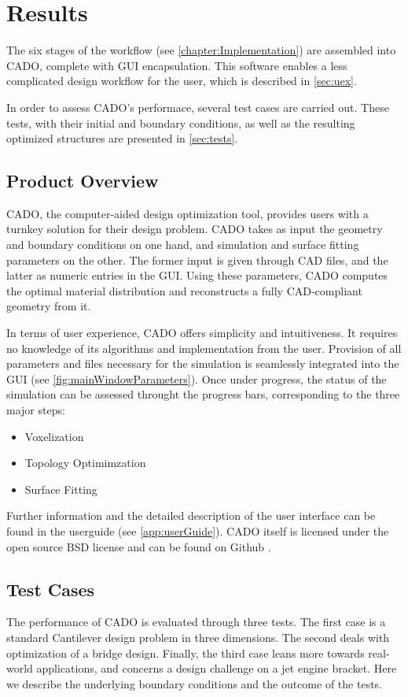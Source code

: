 \chapter{Results}
The six stages of the workflow (see \autoref{chapter:Implementation}) are assembled into CADO, complete with GUI encapsulation. This software enables a less complicated design workflow for the user, which is described in \autoref{sec:uex}. 

In order to assess CADO's performace, several test cases are carried out. These tests, with their initial and boundary conditions, as well as the resulting optimized structures are presented in \autoref{sec:tests}.

\section{Product Overview}
\label{sec:uex}
CADO, the computer-aided design optimization tool, provides users with a turnkey solution for their design problem. CADO takes as input the geometry and boundary conditions on one hand, and simulation and surface fitting parameters on the other. The former input is given through CAD files, and the latter as numeric entries in the GUI. Using these parameters, CADO computes the optimal material distribution and reconstructs a fully CAD-compliant geometry from it.

In terms of user experience, CADO offers simplicity and intuitiveness. It requires no knowledge of its algorithms and implementation from the user. Provision of all parameters and files necessary for the simulation is seamlessly integrated into the GUI (see \autoref{fig:mainWindowParameters}). Once under progress, the status of the simulation can be assessed throught the progress bars, corresponding to the three major steps:
\begin{itemize}
\item Voxelization
\item Topology Optimimzation
\item Surface Fitting
\end{itemize}
Further information and the detailed description of the user interface can be found in the userguide (see \autoref{app:userGuide}). CADO itself is licensed under the open source BSD license and can be found on Github \cite{CADOGit}.


\section{Test Cases}
\label{sec:tests}
The performance of CADO is evaluated through three tests. The first case is a standard Cantilever design problem in three dimensions. The second deals with optimization of a bridge design. Finally, the third case leans more towards real-world applications, and concerns a design challenge on a jet engine bracket. Here we describe the underlying boundary conditions and the outcome of the tests.

